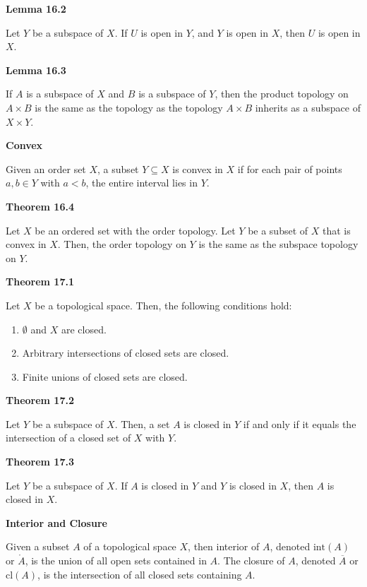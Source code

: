 \documentclass{article}
\begin{document}
\medskip\noindent\textbf{Lemma 16.2}

    Let $Y$ be a subspace of $X$. If $U$ is open in $Y$, and $Y$ is open in $X$, then $U$ is open in $X$.

\medskip\noindent\textbf{Lemma 16.3}

    If $A$ is a subspace of $X$ and $B$ is a subspace of $Y$, then the product topology on $A \times B$ is the same as the topology as the topology $A \times B$ inherits as a subspace of $X \times Y$.

\medskip\noindent\textbf{Convex}

    Given an order set $X$, a subset $Y \subseteq X$ is convex in $X$ if for each pair of points $a,b \in Y$ with $a<b$, the entire interval lies in $Y$.

\medskip\noindent\textbf{Theorem 16.4}

    Let $X$ be an ordered set with the order topology.
    Let $Y$ be a subset of $X$ that is convex in $X$.
    Then, the order topology on $Y$ is the same as the subspace topology on $Y$.

\medskip\noindent\textbf{Theorem 17.1}

    Let $X$ be a topological space. Then, the following conditions hold:
    \begin{enumerate}
        \item $\emptyset$ and $X$ are closed.
        \item Arbitrary intersections of closed sets are closed.
        \item Finite unions of closed sets are closed.
    \end{enumerate}

\medskip\noindent\textbf{Theorem 17.2}

    Let $Y$ be a subspace of $X$. Then, a set $A$ is closed in $Y$ if and only if it equals the intersection of a closed set of $X$ with $Y$.

\medskip\noindent\textbf{Theorem 17.3}

    Let $Y$ be a subspace of $X$. If $A$ is closed in $Y$ and $Y$ is closed in $X$, then $A$ is closed in $X$.

\medskip\noindent\textbf{Interior and Closure}

    Given a subset $A$ of a topological space $X$, then interior of $A$, denoted $\text{int}(A)$ or $\mathring A$, is the union of all open sets contained in $A$.
    The closure of $A$, denoted $\overline A$ or $\text{cl}(A)$, is the intersection of all closed sets containing $A$.
\end{document}

